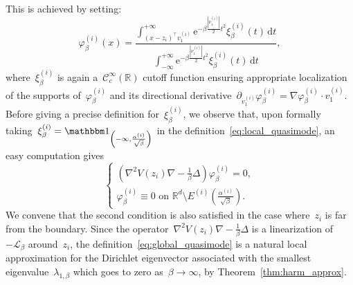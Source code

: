 \documentclass[10pt]{article}
\newcommand{\cL}{\mathcal{L}}
\renewcommand{\d}{\mathrm{d}}
\newcommand{\e}{\mathrm{e}}
\newcommand{\R}{\mathbb{R}}
\newcommand{\1}{\mathbbm 1}
\newcommand{\epsLimit}[1]{\alpha^{(#1)}} %
\newcommand{\hessEigvec}[2]{v^{(#1)}_{#2}} %
\newcommand{\hessEigval}[2]{\nu^{(#1)}_{#2}} %
\newcommand{\halfSpace}[1]{E^{(#1)}}
\newcommand{\fineCutoff}[1]{\xi_\beta^{(#1)}}
\begin{document}
            This is achieved by setting:
            \begin{equation}
                \label{eq:local_quasimode}
                \varphi_\beta^{(i)}(x) = \frac{\displaystyle\int_{(x-z_i)^\intercal \hessEigvec{i}{1}}^{+\infty}\e^{-\beta \frac{|\hessEigval{i}{1}|}{2}t^2} \fineCutoff{i}(t)\,\d t}{\displaystyle\int_{-\infty}^{+\infty} \e^{-\beta\frac{|\hessEigval{i}{1}|}{2}t^2} \fineCutoff{i}(t)\,\d t},
            \end{equation}
            where~$\fineCutoff{i}$ is again a~$\mathcal C_c^\infty(\R)$ cutoff function ensuring appropriate localization of the supports of~$\varphi_\beta^{(i)}$ and its directional derivative~$\partial_{\hessEigvec{i}{1}}\varphi_\beta^{(i)} = \nabla \varphi_\beta^{(i)} \cdot \hessEigvec{i}{1}$.
            Before giving a precise definition for~$\fineCutoff{i}$, we observe that, upon formally taking~$\xi_\beta^{(i)} = \1_{\left(-\infty,\frac{\epsLimit{i}}{\sqrt\beta}\right)}$ in the definition~\eqref{eq:local_quasimode}, an easy computation gives
            \[\left\{\begin{aligned}\left(\nabla^2 V(z_i)\nabla - \frac1\beta \Delta\right)\varphi_\beta^{(i)} = 0,\\
                            \varphi_\beta^{(i)} \equiv 0 \text{ on } \R^d \setminus \halfSpace{i}\left(\frac{\epsLimit{i}}{\sqrt\beta}\right).\end{aligned}\right.\]
            We convene that the second condition is also satisfied in the case where~$z_i$ is far from the boundary.    
            Since the operator~$\nabla^2 V(z_i)\nabla - \frac1\beta \Delta$ is a linearization of~$-\cL_\beta$ around~$z_i$, the definition~\eqref{eq:global_quasimode} is a natural local approximation for the Dirichlet eigenvector associated with the smallest eigenvalue~$\lambda_{1,\beta}$ which goes to zero as~$\beta\to\infty$, by Theorem~\ref{thm:harm_approx}.
\end{document}
